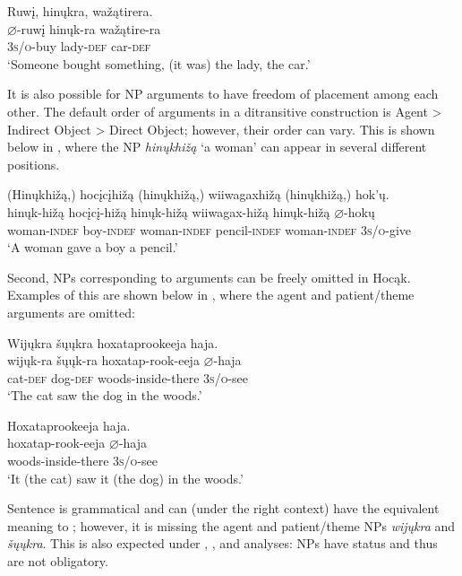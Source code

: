 \documentclass[output=paper]{LSP/langsci}
\begin{document}
\ex\label{ex:jrs:12e}
\glll Ruw\k{i}, 		hin\k{u}kra, 	wa\v{z}ątirera. \\
$\varnothing$-ruw\k{i} 	hin\k{u}k-ra 	wa\v{z}ątire-ra \\ 
\textsc{3s/o}-buy lady-\textsc{def} car-\textsc{def} \\
\trans `Someone bought something, (it was) the lady, the car.'
\z
\z

It is also possible for NP arguments to have freedom of placement among each other. The default order of arguments in a ditransitive construction is Agent > Indirect Object > Direct Object; however, their order can vary.  This is shown below in , where the  NP \textit{hin\k{u}khi\v{z}ą} `a woman' can appear in several different positions.

\ea\label{ex:jrs:13}
\glll (Hin\k{u}khi\v{z}ą,) 	hoc\k{i}c\k{i}hi\v{z}ą 	(hin\k{u}khi\v{z}ą,) wiiwagaxhi\v{z}ą 	(hin\k{u}khi\v{z}ą,) hok'\k{u}.\\
hin\k{u}k-hi\v{z}ą 		hoc\k{i}c\k{i}-hi\v{z}ą 	hin\k{u}k-hi\v{z}ą 		wiiwagax-hi\v{z}ą 	hin\k{u}k-hi\v{z}ą 	$\varnothing$-hok\k{u}\\
	woman-\textsc{indef}	boy-\textsc{indef} 	woman-\textsc{indef} 	pencil-\textsc{indef} 	woman-\textsc{indef} 	\textsc{3s/o}-give\\
\trans `A woman gave a boy a pencil.'
\z
	
Second, NPs corresponding to arguments can be freely omitted in Hocąk. Examples of this are shown below in , where the agent and patient/the\-me arguments are omitted:

\ea\label{ex:jrs:14}
\ea \label{ex:jrs:14a} 
\glll Wij\k{u}kra	\v{s}\k{u}\k{u}kra		hoxataprookeeja 		haja.\\
wij\k{u}k-ra	\v{s}\k{u}\k{u}k-ra	hoxatap-rook-eeja 	$\varnothing$-haja \\
	cat-\textsc{def} 	dog-\textsc{def} 	woods-inside-there 	\textsc{3s/o}-see \\
\trans `The cat saw the dog in the woods.'

\ex \label{ex:jrs:14b}
\glll Hoxataprookeeja haja. \\
hoxatap-rook-eeja 	$\varnothing$-haja \\
woods-inside-there \textsc{3s/o}-see \\
\trans `It (the cat) saw it (the dog) in the woods.'
\z 
\z 

Sentence  is grammatical and can (under the right  context) have the equivalent meaning to ; however, it is missing the agent and patient/the\-me NPs \textit{wij\k{u}kra} and \textit{\v{s}\k{u}\k{u}kra}. This is also expected under  , , and  analyses: NPs have  status and thus are not obligatory.
\end{document}
